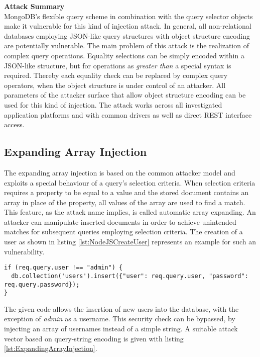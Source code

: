 \textbf{Attack Summary} \\
MongoDB's flexible query scheme in combination with the query selector objects make it vulnerable for this kind of injection attack. In general, all non-relational databases employing JSON-like query structures with object structure encoding are potentially vulnerable. The main problem of this attack is the realization of complex query operations. Equality selections can be simply encoded within a JSON-like structure, but for operations as \emph{greater than} a special syntax is required. Thereby each equality check can be replaced by complex query operators, when the object structure is under control of an attacker. All parameters of the attacker surface that allow object structure encoding can be used for this kind of injection. The attack works across all investigated application platforms and with common drivers as well as direct REST interface access. 

\subsection{Expanding Array Injection}
The expanding array injection is based on the common attacker model and exploits a special behaviour of a query's selection criteria. When selection criteria requires a property to be equal to a value and the stored document contains an array in place of the property, all values of the array are used to find a match. This feature, as the attack name implies, is called automatic array expanding. An attacker can manipulate inserted documents in order to achieve unintended matches for subsequent queries employing selection criteria. The creation of a user as shown in listing \ref{lst:NodeJSCreateUser} represents an example for such an vulnerability. \\

\begin{lstlisting}[caption={Vulnerable NodeJS example for expanding array injection against MongoDB}, label={lst:NodeJSCreateUser}]
if (req.query.user !== "admin") {
  db.collection('users').insert({"user": req.query.user, "password": req.query.password});
}
\end{lstlisting}

The given code allows the insertion of new users into the database, with the exception of \emph{admin} as a username. This security check can be bypassed, by injecting an array of usernames instead of a simple string. A suitable attack vector based on query-string encoding is given with listing \ref{lst:ExpandingArrayInjection}.\\

